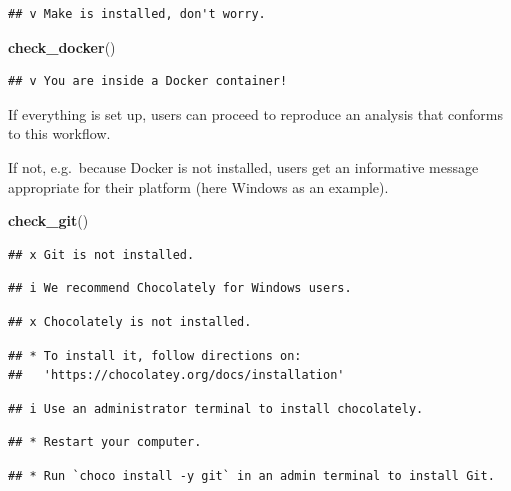 \documentclass[12pt,a4paper,]{article}
\newenvironment{Shaded}{\begin{snugshade}}{\end{snugshade}}
\newcommand{\KeywordTok}[1]{\textcolor[rgb]{0.13,0.29,0.53}{\textbf{#1}}}
\newcommand{\NormalTok}[1]{#1}
\begin{document}
\begin{verbatim}
## v Make is installed, don't worry.
\end{verbatim}

\begin{Shaded}
\begin{Highlighting}[]
\KeywordTok{check_docker}\NormalTok{()}
\end{Highlighting}
\end{Shaded}

\begin{verbatim}
## v You are inside a Docker container!
\end{verbatim}

If everything is set up, users can proceed to reproduce an analysis that conforms to this workflow.

If not, e.g.~because Docker is not installed, users get an informative message appropriate for their platform (here Windows as an example).

\begin{Shaded}
\begin{Highlighting}[]
\KeywordTok{check_git}\NormalTok{()}
\end{Highlighting}
\end{Shaded}

\begin{verbatim}
## x Git is not installed.
\end{verbatim}

\begin{verbatim}
## i We recommend Chocolately for Windows users.
\end{verbatim}

\begin{verbatim}
## x Chocolately is not installed.
\end{verbatim}

\begin{verbatim}
## * To install it, follow directions on: 
##   'https://chocolatey.org/docs/installation'
\end{verbatim}

\begin{verbatim}
## i Use an administrator terminal to install chocolately.
\end{verbatim}

\begin{verbatim}
## * Restart your computer.
\end{verbatim}

\begin{verbatim}
## * Run `choco install -y git` in an admin terminal to install Git.
\end{verbatim}
\end{document}
